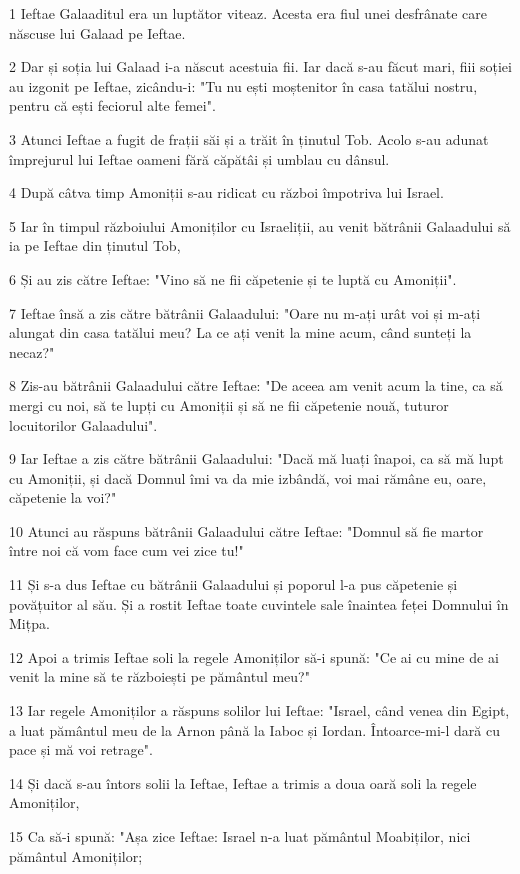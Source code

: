 \par 1 Ieftae Galaaditul era un luptător viteaz. Acesta era fiul unei desfrânate care născuse lui Galaad pe Ieftae.
\par 2 Dar și soția lui Galaad i-a născut acestuia fii. Iar dacă s-au făcut mari, fiii soției au izgonit pe Ieftae, zicându-i: "Tu nu ești moștenitor în casa tatălui nostru, pentru că ești feciorul alte femei".
\par 3 Atunci Ieftae a fugit de frații săi și a trăit în ținutul Tob. Acolo s-au adunat împrejurul lui Ieftae oameni fără căpătâi și umblau cu dânsul.
\par 4 După câtva timp Amoniții s-au ridicat cu război împotriva lui Israel.
\par 5 Iar în timpul războiului Amoniților cu Israeliții, au venit bătrânii Galaadului să ia pe Ieftae din ținutul Tob,
\par 6 Și au zis către Ieftae: "Vino să ne fii căpetenie și te luptă cu Amoniții".
\par 7 Ieftae însă a zis către bătrânii Galaadului: "Oare nu m-ați urât voi și m-ați alungat din casa tatălui meu? La ce ați venit la mine acum, când sunteți la necaz?"
\par 8 Zis-au bătrânii Galaadului către Ieftae: "De aceea am venit acum la tine, ca să mergi cu noi, să te lupți cu Amoniții și să ne fii căpetenie nouă, tuturor locuitorilor Galaadului".
\par 9 Iar Ieftae a zis către bătrânii Galaadului: "Dacă mă luați înapoi, ca să mă lupt cu Amoniții, și dacă Domnul îmi va da mie izbândă, voi mai rămâne eu, oare, căpetenie la voi?"
\par 10 Atunci au răspuns bătrânii Galaadului către Ieftae: "Domnul să fie martor între noi că vom face cum vei zice tu!"
\par 11 Și s-a dus Ieftae cu bătrânii Galaadului și poporul l-a pus căpetenie și povățuitor al său. Și a rostit Ieftae toate cuvintele sale înaintea feței Domnului în Mițpa.
\par 12 Apoi a trimis Ieftae soli la regele Amoniților să-i spună: "Ce ai cu mine de ai venit la mine să te războiești pe pământul meu?"
\par 13 Iar regele Amoniților a răspuns solilor lui Ieftae: "Israel, când venea din Egipt, a luat pământul meu de la Arnon până la Iaboc și Iordan. Întoarce-mi-l dară cu pace și mă voi retrage".
\par 14 Și dacă s-au întors solii la Ieftae, Ieftae a trimis a doua oară soli la regele Amoniților,
\par 15 Ca să-i spună: "Așa zice Ieftae: Israel n-a luat pământul Moabiților, nici pământul Amoniților;
